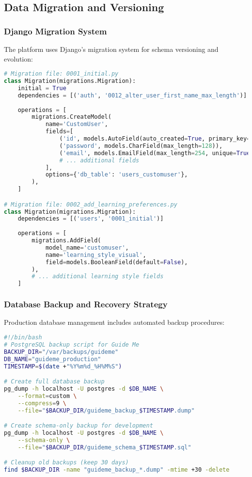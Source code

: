 \documentclass[12pt,a4paper]{article}
\begin{document}
\subsection{Data Migration and Versioning}

\subsubsection{Django Migration System}

The platform uses Django's migration system for schema versioning and evolution:

\begin{lstlisting}[language=Python, caption=Example Migration Structure]
# Migration file: 0001_initial.py
class Migration(migrations.Migration):
    initial = True
    dependencies = [('auth', '0012_alter_user_first_name_max_length')]
    
    operations = [
        migrations.CreateModel(
            name='CustomUser',
            fields=[
                ('id', models.AutoField(auto_created=True, primary_key=True)),
                ('password', models.CharField(max_length=128)),
                ('email', models.EmailField(max_length=254, unique=True)),
                # ... additional fields
            ],
            options={'db_table': 'users_customuser'},
        ),
    ]

# Migration file: 0002_add_learning_preferences.py
class Migration(migrations.Migration):
    dependencies = [('users', '0001_initial')]
    
    operations = [
        migrations.AddField(
            model_name='customuser',
            name='learning_style_visual',
            field=models.BooleanField(default=False),
        ),
        # ... additional learning style fields
    ]
\end{lstlisting}

\subsubsection{Database Backup and Recovery Strategy}

Production database management includes automated backup procedures:

\begin{lstlisting}[language=bash, caption=Database Backup Script Example]
#!/bin/bash
# PostgreSQL backup script for Guide Me
BACKUP_DIR="/var/backups/guideme"
DB_NAME="guideme_production"
TIMESTAMP=$(date +"%Y%m%d_%H%M%S")

# Create full database backup
pg_dump -h localhost -U postgres -d $DB_NAME \
    --format=custom \
    --compress=9 \
    --file="$BACKUP_DIR/guideme_backup_$TIMESTAMP.dump"

# Create schema-only backup for development
pg_dump -h localhost -U postgres -d $DB_NAME \
    --schema-only \
    --file="$BACKUP_DIR/guideme_schema_$TIMESTAMP.sql"

# Cleanup old backups (keep 30 days)
find $BACKUP_DIR -name "guideme_backup_*.dump" -mtime +30 -delete
\end{lstlisting}
\end{document}

